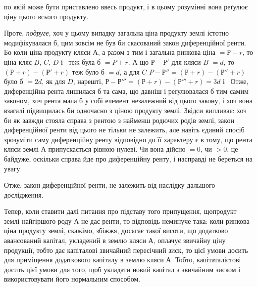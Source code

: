 \parcont{}  %
по якій може бути приставлено ввесь продукт, і в цьому розумінні вона реґулює
ціну цього всього продукту.

Проте, \emph{подруге}, хоч у цьому випадку загальна ціна продукту землі
істотно модифікувалася б, цим зовсім не був би скасований закон диференційної
ренти. Бо коли ціна продукту кляси $А$, а разом з тим і загальна ринкова
ціна $= Р + r$, то ціна кляс $B$, $C$, $D$ і~ теж була б
$= P + r$. А що
$Р - Р'$ для кляси $B$ $= d$, то $(Р + r) - (Р' + r)$ теж було б $= d$, а для $C$
$P - Р'' = (Р + r) - (Р'' + r)$ було б $= 2d$, як для $D$, нарешті,
$Р - Р''' = (Р + r) - (Р''' + r) = 3d$ і~ Отже, диференційна рента лишилася б та сама, що
давніш і реґулювалася б тим самим законом, хоч рента мала б у собі елемент незалежний
від цього закону, і хоч вона взагалі підвищилась би одночасно з ціною продукту
землі. Звідси випливає: хоч би як завжди стояла справа з рентою з найменш
родючих родів землі, закон диференційної ренти від цього не тільки не залежить,
але навіть єдиний спосіб зрозуміти саму диференційну ренту відповідно до її
характеру є в тому, що рента кляси землі $А$ припускається рівною нулеві. Чи
вона дійсно $= 0$, чи $> 0$, це байдуже, оскільки справа йде про диференційну
ренту, і насправді не береться на увагу.

Отже, закон диференційної ренти, не залежить від наслідку дальшого
дослідження.

Тепер, коли ставити далі питання про підставу того припущення, щопродукт
землі найгіршого роду $А$ не дає ренти, то відповідь неминуче така:
коли ринкова ціна продукту землі, скажімо, збіжжя, досягає такої висоти, що
додатково авансований капітал, укладений в землю кляси $А$, оплачує звичайну
ціну продукції, тобто дає капіталові звичайний пересічний зиск, то цієї умови
досить для приміщення додаткового капіталу в землю кляси $А$. Тобто, капітаталістові
досить цієї умови для того, щоб укладати новий капітал з звичайним
зиском і використовувати його нормальним способом.

